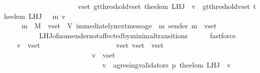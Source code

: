 \begin{isabellebody}
\ \ \ \ \ \ \ \ \ \ \ \ \ \ \ \ \ \ \ \ {\isacharparenleft}{\isasymforall}\ v{\isacharunderscore}set{\isacharprime}{\isachardot}\ gt{\isacharunderscore}threshold{\isacharparenleft}v{\isacharunderscore}set{\isacharprime}{\isacharcomma}\ the{\isacharunderscore}elem\ {\isacharparenleft}L{\isacharunderscore}H{\isacharunderscore}J\ {\isasymsigma}\ v{\isacharparenright}{\isacharparenright}\ {\isasymlongrightarrow}\ gt{\isacharunderscore}threshold{\isacharparenleft}v{\isacharunderscore}set{\isacharprime}{\isacharcomma}\ the{\isacharunderscore}elem\ {\isacharparenleft}L{\isacharunderscore}H{\isacharunderscore}J\ {\isacharparenleft}{\isasymsigma}\ {\isasymunion}\ {\isacharbraceleft}m{\isacharbraceright}{\isacharparenright}\ v{\isacharparenright}{\isacharparenright}{\isacharparenright}{\isachardoublequoteclose}\isanewline
\ \ \ \ \isamarkupfalse%
\ {\isacartoucheopen}{\isasymsigma}\ {\isasymin}\ {\isasymSigma}\ {\isasymand}\ m\ {\isasymin}\ M\ {\isasymand}\ v{\isacharunderscore}set\ {\isasymsubseteq}\ V{\isacartoucheclose}\ {\isacartoucheopen}immediately{\isacharunderscore}next{\isacharunderscore}message\ {\isacharparenleft}{\isasymsigma}{\isacharcomma}\ m{\isacharparenright}{\isacartoucheclose}\ {\isacartoucheopen}sender\ m\ {\isasymnotin}\ v{\isacharunderscore}set{\isacartoucheclose}\isanewline
\ \ \ \ \ \ \ \ \ \ L{\isacharunderscore}H{\isacharunderscore}J{\isacharunderscore}of{\isacharunderscore}non{\isacharunderscore}sender{\isacharunderscore}not{\isacharunderscore}affected{\isacharunderscore}by{\isacharunderscore}minimal{\isacharunderscore}transitions\isanewline
\ \ \ \ \isamarkupfalse%
\ fastforce\isanewline
\ \ \isanewline
\ \ \isamarkupfalse%
\ \isamarkupfalse%
\ {\isachardoublequoteopen}{\isasymforall}\ v\ {\isasymin}\ v{\isacharunderscore}set{\isachardot}\isanewline
\ \ \ \ \ \ \ \ \ \ \ \ \ \ \ \ \ \ \ \ {\isacharparenleft}{\isasymforall}\ v{\isacharunderscore}set{\isacharprime}{\isachardot}\ v{\isacharunderscore}set{\isacharprime}\ {\isasymsubseteq}\ v{\isacharunderscore}set\ {\isasymand}\isanewline
\ \ \ \ \ \ \ \ \ \ \ \ \ \ \ \ \ \ \ \ \ \ \ \ {\isacharparenleft}{\isasymforall}\ v{\isacharprime}\ {\isasymin}\ v{\isacharunderscore}set{\isacharprime}{\isachardot}\ \isanewline
\ \ \ \ \ \ \ \ \ \ \ \ \ \ \ \ \ \ \ \ \ \ \ \ \ \ \ \ v{\isacharprime}\ {\isasymin}\ agreeing{\isacharunderscore}validators\ {\isacharparenleft}p{\isacharcomma}\ {\isacharparenleft}the{\isacharunderscore}elem\ {\isacharparenleft}L{\isacharunderscore}H{\isacharunderscore}J\ {\isasymsigma}\ v{\isacharparenright}{\isacharparenright}{\isacharparenright}\isanewline

\end{isabellebody}
